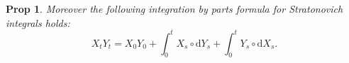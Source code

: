 \documentclass[a4paper]{article}
\theoremstyle{mytheoremstyle}
\newtheorem{proposition}{Prop}
\newcommand{\1}{\mathds{1}}
\begin{document}
\begin{multicols*}{3}
\begin{unlabeledbox}
\begin{proposition}
  Moreover the following {\emph{integration by parts}} formula for
  Stratonovich integrals holds:
  \begin{equation}
    X_t Y_t = X_0 Y_0 + \int_0^t X_s \circ \mathrm{d} Y_s + \int_0^t Y_s \circ
    \mathrm{d} X_s . \label{eq:IBP.Stratonovich}
  \end{equation}
\end{proposition}
\end{unlabeledbox}

\end{multicols*}
\end{document}

